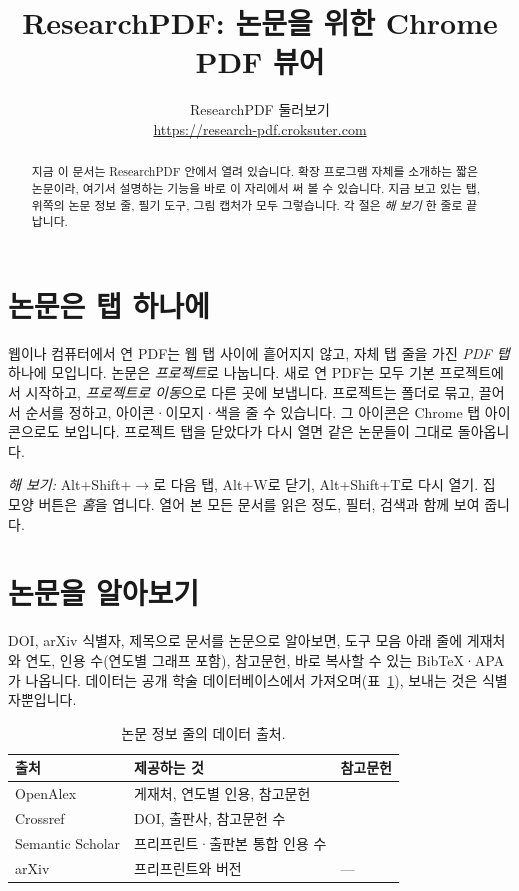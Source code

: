 \documentclass[11pt]{article}
\title{\textbf{ResearchPDF: 논문을 위한 Chrome PDF 뷰어}}
\author{ResearchPDF 둘러보기\\[2pt]\small\url{https://research-pdf.croksuter.com}}
\date{}
\begin{document}
\maketitle

\begin{abstract}
\noindent
지금 이 문서는 ResearchPDF 안에서 열려 있습니다. 확장 프로그램 자체를 소개하는
짧은 논문이라, 여기서 설명하는 기능을 바로 이 자리에서 써 볼 수 있습니다. 지금
보고 있는 탭, 위쪽의 논문 정보 줄, 필기 도구, 그림 캡처가 모두 그렇습니다. 각 절은
\emph{해 보기} 한 줄로 끝납니다.
\end{abstract}

\section{논문은 탭 하나에}
웹이나 컴퓨터에서 연 PDF는 웹 탭 사이에 흩어지지 않고, 자체 탭 줄을 가진
\emph{PDF 탭} 하나에 모입니다. 논문은 \emph{프로젝트}로 나눕니다. 새로 연 PDF는 모두
기본 프로젝트에서 시작하고, \emph{프로젝트로 이동}으로 다른 곳에 보냅니다. 프로젝트는
폴더로 묶고, 끌어서 순서를 정하고, 아이콘·이모지·색을 줄 수 있습니다. 그 아이콘은
Chrome 탭 아이콘으로도 보입니다. 프로젝트 탭을 닫았다가 다시 열면 같은 논문들이
그대로 돌아옵니다.

\smallskip\noindent\emph{해 보기:} \textsf{Alt+Shift+\(\rightarrow\)}로 다음 탭,
\textsf{Alt+W}로 닫기, \textsf{Alt+Shift+T}로 다시 열기. 집 모양 버튼은 \emph{홈}을
엽니다. 열어 본 모든 문서를 읽은 정도, 필터, 검색과 함께 보여 줍니다.

\section{논문을 알아보기}
DOI, arXiv 식별자, 제목으로 문서를 논문으로 알아보면, 도구 모음 아래 줄에 게재처와
연도, 인용 수(연도별 그래프 포함), 참고문헌, 바로 복사할 수 있는 BibTeX·APA가
나옵니다. 데이터는 공개 학술 데이터베이스에서 가져오며(표~\ref{tab:sources}),
보내는 것은 식별자뿐입니다.

\begin{table}[h]
\centering
\caption{논문 정보 줄의 데이터 출처.}
\label{tab:sources}
\begin{tabular}{@{}lll@{}}
\toprule
출처 & 제공하는 것 & 참고문헌 \\
\midrule
OpenAlex & 게재처, 연도별 인용, 참고문헌 & \cite{openalex} \\
Crossref & DOI, 출판사, 참고문헌 수 & \cite{crossref} \\
Semantic Scholar & 프리프린트·출판본 통합 인용 수 & \cite{s2} \\
arXiv & 프리프린트와 버전 & --- \\
\bottomrule
\end{tabular}
\end{table}
\end{document}

